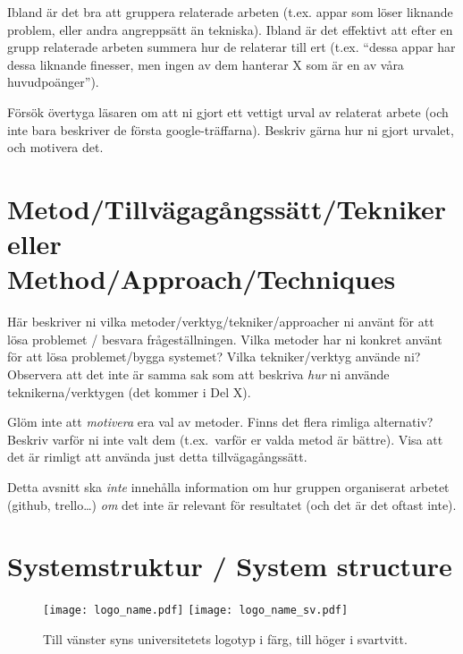 \documentclass[a4paper,12pt]{article}
\begin{document}
Ibland är det bra att gruppera relaterade arbeten (t.ex. appar som löser liknande problem, eller andra angreppsätt än tekniska).
Ibland är det effektivt att efter en grupp relaterade arbeten summera hur de relaterar till ert (t.ex. ``dessa appar har dessa liknande finesser, men ingen av dem hanterar X som är en av våra huvudpoänger'').

Försök övertyga läsaren om att ni gjort ett vettigt urval av relaterat arbete (och inte bara beskriver de första google-träffarna). Beskriv gärna hur ni gjort urvalet, och motivera det.

\section{Metod/Tillvägagångssätt/Tekniker eller Method/Approach/Techniques}
Här beskriver ni vilka metoder/verktyg/tekniker/approacher ni använt för att lösa problemet / besvara frågeställningen.  Vilka metoder har ni konkret använt för att lösa problemet/bygga systemet?  Vilka tekniker/verktyg använde ni? Observera att det inte är samma sak som att beskriva \emph{hur} ni använde teknikerna/verktygen (det kommer i Del X).

Glöm inte att \emph{motivera} era val av metoder. Finns det flera rimliga alternativ? Beskriv varför ni inte valt dem (t.ex.~varför er valda metod är bättre).
Visa att det är rimligt att använda just detta tillvägagångssätt.

Detta avsnitt ska \emph{inte} innehålla information om hur gruppen organiserat arbetet (github, trello\ldots) \emph{om} det inte är relevant för resultatet (och det är det oftast inte).

\section{Systemstruktur / System structure}
\begin{figure}
\begin{center}
  \texttt{[image: logo\_name.pdf]}
\hspace{2cm}
  \texttt{[image: logo\_name\_sv.pdf]}
\end{center}
\caption{Till vänster syns universitetets logotyp i färg, till höger i svartvitt.}
  \label{fig:exempel}
\end{figure}
\end{document}
